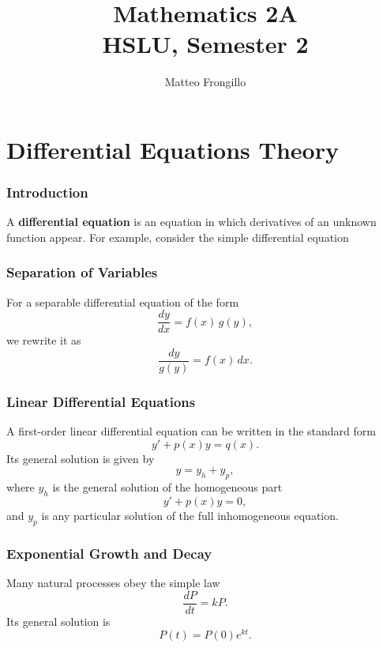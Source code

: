 \documentclass{article}
\title{\textbf{Mathematics 2A \\ HSLU, Semester 2}}
\author{Matteo Frongillo}
\date{}
\begin{document}
\maketitle
\tableofcontents
\pagebreak

\part{Differential Equations Theory}

\section{Introduction}
A \textbf{differential equation} is an equation in which derivatives of an unknown function appear. For example, consider the simple differential equation

\section{Separation of Variables}
For a separable differential equation of the form
\[
\frac{dy}{dx}=f(x)\,g(y),
\]
we rewrite it as
\[
\frac{dy}{g(y)}=f(x)\,dx.
\]

\section{Linear Differential Equations}
A first-order linear differential equation can be written in the standard form
\[
y'+p(x)y=q(x).
\]
Its general solution is given by
\[
y=y_h+y_p,
\]
where \(y_h\) is the general solution of the homogeneous part
\[
y'+p(x)y=0,
\]
and \(y_p\) is any particular solution of the full inhomogeneous equation.

\section{Exponential Growth and Decay}
Many natural processes obey the simple law
\[
\frac{dP}{dt}=kP.
\]
Its general solution is
\[
P(t)=P(0)e^{kt}.
\]
\end{document}
